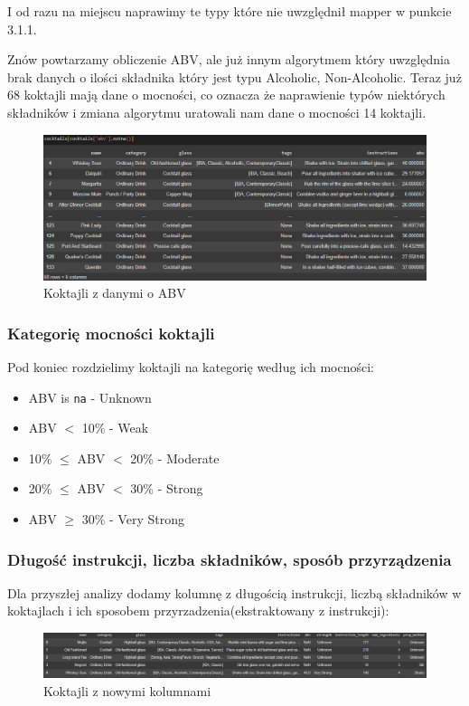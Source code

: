 \documentclass{article}
\begin{document}
I od razu na miejscu naprawimy te typy które nie uwzględnił mapper w punkcie 3.1.1.

Znów powtarzamy obliczenie ABV, ale już innym algorytmem który uwzględnia brak danych o ilości składnika który jest typu Alcoholic, Non-Alcoholic. Teraz już 68 koktajli mają dane o mocności, co oznacza że naprawienie typów niektórych składników i zmiana algorytmu uratowali nam dane o mocności 14 koktajli.

\begin{figure}[htbp]
\centering
    \includegraphics[width=0.8\linewidth]{c_i_5.png}
    \caption{Koktajli z danymi o ABV}
\end{figure}

\subsubsection{Kategorię mocności koktajli}

Pod koniec rozdzielimy koktajli na kategorię według ich mocności:
\begin{itemize}
    \item ABV is \texttt{na} - Unknown
    \item ABV $<$ 10\% - Weak
    \item 10\% $\leq$ ABV $<$ 20\% - Moderate
    \item 20\% $\leq$ ABV $<$ 30\% - Strong
    \item ABV $\geq$ 30\% - Very Strong
\end{itemize}

\subsubsection{Długość instrukcji, liczba składników, sposób przyrządzenia}
Dla przyszłej analizy dodamy kolumnę z długością instrukcji, liczbą składników w koktajlach i ich sposobem przyrzadzenia(ekstraktowany z instrukcji):
\begin{figure}[htbp]
\centering
    \includegraphics[width=1\linewidth]{cocktails_2.png}
    \caption{Koktajli z nowymi kolumnami}
\end{figure}
\end{document}
